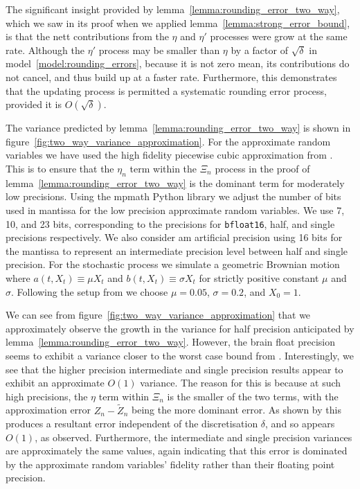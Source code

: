 \documentclass[manuscript,review]{acmart}
\begin{document}
The significant insight provided by lemma~\ref{lemma:rounding_error_two_way}, which we saw in its proof when we applied lemma~\ref{lemma:strong_error_bound}, is that the nett contributions from the $ \eta $ and $ \eta' $ processes were grow at the same rate. Although the $ \eta' $ process may be smaller than $ \eta $ by a factor of $ \sqrt{\delta} $ in model~\ref{model:rounding_errors}, because it is not zero mean, its contributions do not cancel, and thus build up at a faster rate. Furthermore, this demonstrates that the updating process is permitted a systematic rounding error process, provided it is $ O(\sqrt{\delta}) $.

The variance predicted by lemma~\ref{lemma:rounding_error_two_way} is shown in figure~\ref{fig:two_way_variance_approximation}. For the approximate random variables we have used the high fidelity piecewise cubic approximation from \citet{giles2020approximating}. This is to ensure that the $ \eta_n $ term within the $ \Xi_n $ process in the proof of lemma~\ref{lemma:rounding_error_two_way} is the dominant term for moderately low precisions. Using the mpmath Python library \citep{mpmath} we adjust the number of bits used in mantissa for the low precision approximate random variables. We use 7, 10, and 23 bits, corresponding to the precisions for \texttt{bfloat16}, half, and single precisions respectively. We also consider am artificial precision using 16 bits for the mantissa to represent an intermediate precision level between half and single precision. For the stochastic process we simulate a geometric Brownian motion where $ a(t, X_t) \equiv \mu X_t $ and $ b(t, X_t) \equiv \sigma X_t $ for strictly positive constant $ \mu $ and $ \sigma $. Following the setup from \citet{giles2008multilevel} we choose $ \mu = 0.05 $, $ \sigma = 0.2 $, and $ X_0 = 1 $.

We can see from figure~\ref{fig:two_way_variance_approximation} that we approximately observe the growth in the variance for half precision anticipated by lemma~\ref{lemma:rounding_error_two_way}. However, the brain float precision seems to exhibit a variance closer to the worst case bound from \citet{omland2016mixed}. Interestingly, we see that the higher precision intermediate and single precision results appear to exhibit an approximate $ O(1) $ variance. The reason for this is because at such high precisions, the $ \eta $ term within $ \Xi_n $ is the smaller of the two terms, with the approximation error $ Z_n - \widetilde{Z}_n $ being the more dominant error. As shown by \citet{giles2020approximate} this produces a resultant error independent of the discretisation $ \delta $, and so appears $ O(1) $, as observed. Furthermore, the intermediate and single precision variances are approximately the same values, again indicating that this error is dominated by the approximate random variables' fidelity rather than their floating point precision. 
\end{document}
